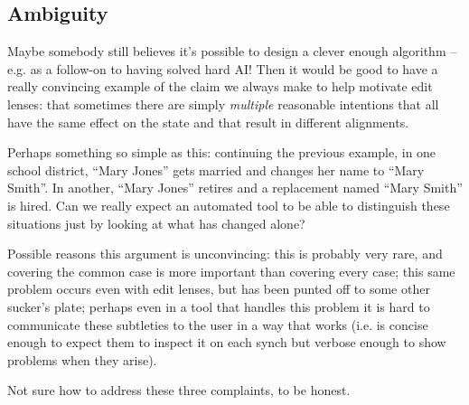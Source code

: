 \subsection{Ambiguity}
Maybe somebody still believes it's possible to design a clever enough
algorithm -- e.g. as a follow-on to having solved hard AI! Then it would be
good to have a really convincing example of the claim we always make to help
motivate edit lenses: that sometimes there are simply \emph{multiple}
reasonable intentions that all have the same effect on the state and that
result in different alignments.

Perhaps something so simple as this: continuing the previous example, in one
school district, ``Mary Jones'' gets married and changes her name to ``Mary
Smith''. In another, ``Mary Jones'' retires and a replacement named ``Mary
Smith'' is hired. Can we really expect an automated tool to be able to
distinguish these situations just by looking at what has changed alone?

Possible reasons this argument is unconvincing: this is probably very rare,
and covering the common case is more important than covering every case;
this same problem occurs even with edit lenses, but has been punted off to
some other sucker's plate; perhaps even in a tool that handles this problem
it is hard to communicate these subtleties to the user in a way that works
(i.e. is concise enough to expect them to inspect it on each synch but
verbose enough to show problems when they arise).

Not sure how to address these three complaints, to be honest.
